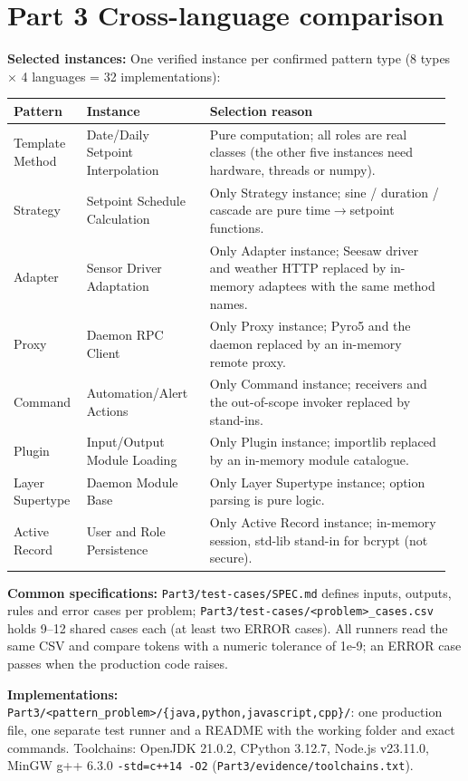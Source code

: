 \documentclass[11pt,a4paper]{article}
\newcommand{\field}[2]{\textbf{#1:} #2\par}
\begin{document}
\section{Part 3 Cross-language comparison}
\field{Selected instances}{One verified instance per confirmed pattern type (8 types $\times$ 4 languages = 32 implementations):}
{\small\setlength{\tabcolsep}{3pt}
\begin{longtable}{@{}P{0.16\linewidth}P{0.27\linewidth}P{0.53\linewidth}@{}}\toprule
\textbf{Pattern} & \textbf{Instance} & \textbf{Selection reason} \\ \midrule\endhead
Template Method & Date/Daily Setpoint Interpolation & Pure computation; all roles are real classes (the other five instances need hardware, threads or numpy). \\
Strategy & Setpoint Schedule Calculation & Only Strategy instance; sine / duration / cascade are pure time$\rightarrow$setpoint functions. \\
Adapter & Sensor Driver Adaptation & Only Adapter instance; Seesaw driver and weather HTTP replaced by in-memory adaptees with the same method names. \\
Proxy & Daemon RPC Client & Only Proxy instance; Pyro5 and the daemon replaced by an in-memory remote proxy. \\
Command & Automation/Alert Actions & Only Command instance; receivers and the out-of-scope invoker replaced by stand-ins. \\
Plugin & Input/Output Module Loading & Only Plugin instance; importlib replaced by an in-memory module catalogue. \\
Layer Supertype & Daemon Module Base & Only Layer Supertype instance; option parsing is pure logic. \\
Active Record & User and Role Persistence & Only Active Record instance; in-memory session, std-lib stand-in for bcrypt (not secure). \\
\bottomrule\end{longtable}}
\field{Common specifications}{\texttt{Part3/\allowbreak{}test-cases/\allowbreak{}SPEC.\allowbreak{}md} defines inputs, outputs, rules and error cases per problem; \texttt{Part3/\allowbreak{}test-cases/\allowbreak{}\textless{}problem\textgreater{}\_\allowbreak{}cases.\allowbreak{}csv} holds 9--12 shared cases each (at least two ERROR cases). All runners read the same CSV and compare tokens with a numeric tolerance of 1e-9; an ERROR case passes when the production code raises.}
\field{Implementations}{\texttt{Part3/\allowbreak{}\textless{}pattern\_\allowbreak{}problem\textgreater{}/\allowbreak{}\{java,python,javascript,cpp\}/\allowbreak{}}: one production file, one separate test runner and a README with the working folder and exact commands. Toolchains: OpenJDK 21.0.2, CPython 3.12.7, Node.js v23.11.0, MinGW g++ 6.3.0 \texttt{-std=c++14 -O2} (\texttt{Part3/\allowbreak{}evidence/\allowbreak{}toolchains.\allowbreak{}txt}).}
\end{document}
